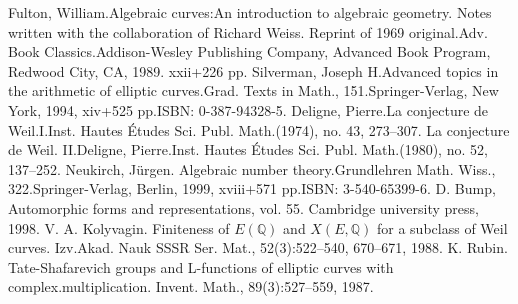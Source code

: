\documentclass[11pt]{ctexart}
\begin{document}
\begin{thebibliography}{100}
    Fulton, William.Algebraic curves:An introduction to algebraic geometry. Notes written with the collaboration of Richard Weiss. Reprint of 1969 original.Adv. Book Classics.Addison-Wesley Publishing Company, Advanced Book Program, Redwood City, CA, 1989. xxii+226 pp.
    Silverman, Joseph H.Advanced topics in the arithmetic of elliptic curves.Grad. Texts in Math., 151.Springer-Verlag, New York, 1994, xiv+525 pp.ISBN: 0-387-94328-5.
     Deligne, Pierre.La conjecture de Weil.I.Inst. Hautes Études Sci. Publ. Math.(1974), no. 43, 273–307.
    La conjecture de Weil. II.Deligne, Pierre.Inst. Hautes Études Sci. Publ. Math.(1980), no. 52, 137–252.
     Neukirch, Jürgen. Algebraic number theory.Grundlehren Math. Wiss., 322.Springer-Verlag, Berlin, 1999, xviii+571 pp.ISBN: 3-540-65399-6.
     D. Bump, Automorphic forms and representations, vol. 55. Cambridge university press, 1998.
    V. A. Kolyvagin. Finiteness of $E(\mathbb{Q})$ and $X(E, \mathbb{Q})$ for a subclass of Weil curves. Izv.Akad. Nauk SSSR Ser. Mat., 52(3):522–540, 670–671, 1988.
    K. Rubin. Tate-Shafarevich groups and L-functions of elliptic curves with complex.multiplication. Invent. Math., 89(3):527–559, 1987.
 \end{thebibliography}

 
\end{document}
